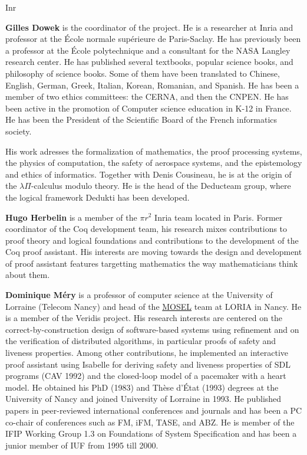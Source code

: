 \begin{sitedescription}{Inr}
\begin{compactitem}
\item{\bf Gilles Dowek} is the coordinator of the project.
He is a researcher at Inria and professor at the École
normale supérieure de Paris-Saclay. He has previously been a professor
at the École polytechnique and a consultant for the NASA Langley
research center. He has published several textbooks, popular science
books, and philosophy of science books. Some of them have been
translated to Chinese, English, German, Greek, Italian, Korean,
Romanian, and Spanish. He has been a member of two ethics committees:
the CERNA, and then the CNPEN. 
He has been active in the promotion of
Computer science education in K-12 in France. He has been the
President of the Scientific Board of the French informatics society.

His work adresses the formalization of mathematics, the proof
processing systems, the physics of computation, the safety of
aerospace systems, and the epistemology and ethics of informatics.
Together with Denis Cousineau, he is at the origin of the
$\lambda\Pi$-calculus modulo theory. He is the head of the Deducteam
group, where the logical framework Dedukti has been developed.

\item{\bf Hugo Herbelin} is a member of the $\pi r^2$ Inria team
located in Paris. Former coordinator of the Coq development team,
his research mixes contributions to proof theory and logical
foundations and contributions to the development of the Coq proof
assistant. His interests are moving towards the design and development
of proof assistant features targetting mathematics the way
mathematicians think about them.

\item{\bf Dominique M\'ery}  is a professor of computer science at the
  University of Lorraine (Telecom Nancy)  and head of the
  \href{https://mosel.loria.fr}{MOSEL} team at LORIA in Nancy.
  He is a member of the Veridis project.
His research interests are centered on the   correct-by-construction
design  of software-based systems  using refinement and on the
verification   of distributed algorithms, in particular proofs of safety and liveness
properties. Among other contributions, he implemented an interactive
proof assistant using Isabelle  for deriving safety and liveness
properties of SDL programs (CAV 1992) and  the closed-loop model of
a pacemaker with a heart model.
He obtained his PhD (1983) and Thèse d'État (1993) degrees at the
University of Nancy and joined University of Lorraine in 1993. He published  papers
in peer-reviewed international conferences and journals and has been a PC co-chair
of conferences such as FM, iFM, TASE, and ABZ. He is member of the IFIP
Working Group 1.3 on Foundations of System Specification and has been a junior member of IUF from 1995 till 2000.


\end{compactitem}
\end{sitedescription}
